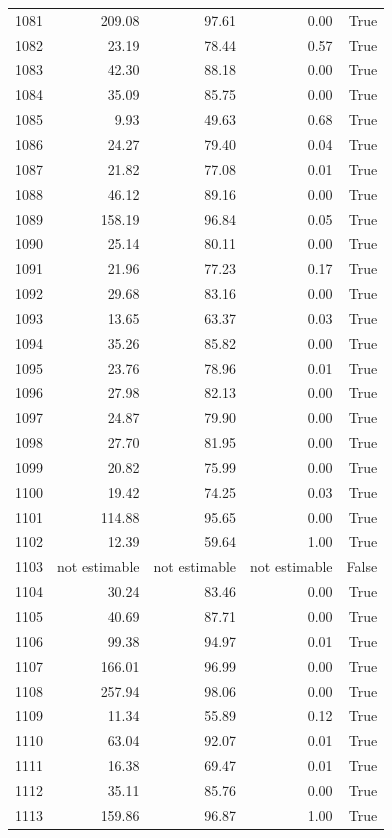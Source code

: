 \begin{longtable}{rrrrr}
1081 & 209.08 & 97.61 & 0.00 & True \\
1082 & 23.19 & 78.44 & 0.57 & True \\
1083 & 42.30 & 88.18 & 0.00 & True \\
1084 & 35.09 & 85.75 & 0.00 & True \\
1085 & 9.93 & 49.63 & 0.68 & True \\
1086 & 24.27 & 79.40 & 0.04 & True \\
1087 & 21.82 & 77.08 & 0.01 & True \\
1088 & 46.12 & 89.16 & 0.00 & True \\
1089 & 158.19 & 96.84 & 0.05 & True \\
1090 & 25.14 & 80.11 & 0.00 & True \\
1091 & 21.96 & 77.23 & 0.17 & True \\
1092 & 29.68 & 83.16 & 0.00 & True \\
1093 & 13.65 & 63.37 & 0.03 & True \\
1094 & 35.26 & 85.82 & 0.00 & True \\
1095 & 23.76 & 78.96 & 0.01 & True \\
1096 & 27.98 & 82.13 & 0.00 & True \\
1097 & 24.87 & 79.90 & 0.00 & True \\
1098 & 27.70 & 81.95 & 0.00 & True \\
1099 & 20.82 & 75.99 & 0.00 & True \\
1100 & 19.42 & 74.25 & 0.03 & True \\
1101 & 114.88 & 95.65 & 0.00 & True \\
1102 & 12.39 & 59.64 & 1.00 & True \\
1103 & not estimable & not estimable & not estimable & False \\
1104 & 30.24 & 83.46 & 0.00 & True \\
1105 & 40.69 & 87.71 & 0.00 & True \\
1106 & 99.38 & 94.97 & 0.01 & True \\
1107 & 166.01 & 96.99 & 0.00 & True \\
1108 & 257.94 & 98.06 & 0.00 & True \\
1109 & 11.34 & 55.89 & 0.12 & True \\
1110 & 63.04 & 92.07 & 0.01 & True \\
1111 & 16.38 & 69.47 & 0.01 & True \\
1112 & 35.11 & 85.76 & 0.00 & True \\
1113 & 159.86 & 96.87 & 1.00 & True \\

\end{longtable}
